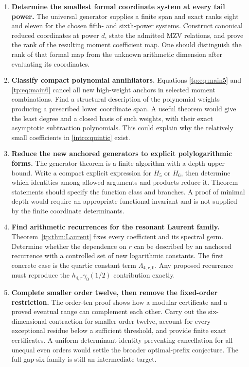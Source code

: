 \documentclass[11pt,a4paper]{article}
\numberwithin{equation}{section}
\theoremstyle{definition}
\theoremstyle{remark}
\begin{document}
\begin{enumerate}[label=\textbf{R\arabic*.}]
\item \textbf{Determine the smallest formal coordinate system at every
tail power.}
The universal generator supplies a finite span and exact ranks eight
and eleven for the chosen fifth- and sixth-power systems. Construct
canonical reduced coordinates at power $d$, state the admitted MZV
relations, and prove the rank of the resulting moment coefficient map.
One should distinguish the rank of that formal map from the unknown
arithmetic dimension after evaluating its coordinates.

\item \textbf{Classify compact polynomial annihilators.}
Equations \eqref{tp:eq:main5} and \eqref{tp:eq:main6} cancel all new
high-weight anchors in selected moment combinations. Find a structural
description of the polynomial weights producing a prescribed lower
coordinate span. A useful theorem would give the least degree and a
closed basis of such weights, with their exact asymptotic subtraction
polynomials. This could explain why the relatively small coefficients
in \eqref{intro:quintic} exist.

\item \textbf{Reduce the new anchored generators to explicit
polylogarithmic forms.}
The generator theorem is a finite algorithm with a depth upper bound.
Write a compact explicit expression for $H_5$ or $H_6$, then determine
which identities among allowed arguments and products reduce it.
Theorem statements should specify the function class and branches.
A proof of minimal depth would require an appropriate functional
invariant and is not supplied by the finite coordinate determinants.

\item \textbf{Find arithmetic recurrences for the resonant Laurent
family.}
Theorem~\ref{tp:thm:Laurent} fixes every coefficient and its spectral
germ. Determine whether the dependence on $r$ can be described by an
anchored recurrence with a controlled set of new logarithmic constants.
The first concrete case is the quartic constant term
$\Lambda_{4,r,0}$. Any proposed recurrence must reproduce the
$h_{4,r}\gamma_0(1/2)$ contribution exactly.

\item \textbf{Complete smaller order twelve, then remove the fixed-order
restriction.}
The order-ten proof shows how a modular certificate and a proved
eventual range can complement each other. Carry out the six-dimensional
contraction for smaller order twelve, account for every exceptional
residue below a sufficient threshold, and provide finite exact
certificates. A uniform determinant identity preventing cancellation
for all unequal even orders would settle the broader optimal-prefix
conjecture. The full gap-six family is still an intermediate target.


\end{enumerate}
\end{document}
